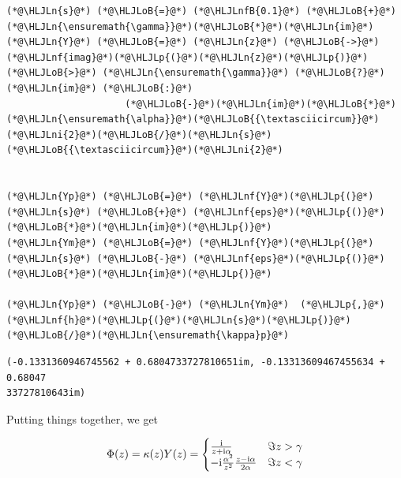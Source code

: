 \documentclass[12pt,a4paper]{article}
\newcommand{\HLJLn}[1]{#1}
\newcommand{\HLJLnf}[1]{\textcolor[RGB]{66,102,213}{#1}}
\newcommand{\HLJLnfB}[1]{\textcolor[RGB]{59,151,46}{#1}}
\newcommand{\HLJLni}[1]{\textcolor[RGB]{59,151,46}{#1}}
\newcommand{\HLJLoB}[1]{\textcolor[RGB]{102,102,102}{\textbf{#1}}}
\newcommand{\HLJLp}[1]{#1}
\def\I{ {\rm i} }
\begin{document}
\begin{lstlisting}
(*@\HLJLn{s}@*) (*@\HLJLoB{=}@*) (*@\HLJLnfB{0.1}@*) (*@\HLJLoB{+}@*) (*@\HLJLn{\ensuremath{\gamma}}@*)(*@\HLJLoB{*}@*)(*@\HLJLn{im}@*) 
(*@\HLJLn{Y}@*) (*@\HLJLoB{=}@*) (*@\HLJLn{z}@*) (*@\HLJLoB{->}@*) (*@\HLJLnf{imag}@*)(*@\HLJLp{(}@*)(*@\HLJLn{z}@*)(*@\HLJLp{)}@*) (*@\HLJLoB{>}@*) (*@\HLJLn{\ensuremath{\gamma}}@*) (*@\HLJLoB{?}@*) (*@\HLJLn{im}@*) (*@\HLJLoB{:}@*)
                     (*@\HLJLoB{-}@*)(*@\HLJLn{im}@*)(*@\HLJLoB{*}@*)(*@\HLJLn{\ensuremath{\alpha}}@*)(*@\HLJLoB{{\textasciicircum}}@*)(*@\HLJLni{2}@*)(*@\HLJLoB{/}@*)(*@\HLJLn{s}@*)(*@\HLJLoB{{\textasciicircum}}@*)(*@\HLJLni{2}@*)


(*@\HLJLn{Yp}@*) (*@\HLJLoB{=}@*) (*@\HLJLnf{Y}@*)(*@\HLJLp{(}@*)(*@\HLJLn{s}@*) (*@\HLJLoB{+}@*) (*@\HLJLnf{eps}@*)(*@\HLJLp{()}@*)(*@\HLJLoB{*}@*)(*@\HLJLn{im}@*)(*@\HLJLp{)}@*)
(*@\HLJLn{Ym}@*) (*@\HLJLoB{=}@*) (*@\HLJLnf{Y}@*)(*@\HLJLp{(}@*)(*@\HLJLn{s}@*) (*@\HLJLoB{-}@*) (*@\HLJLnf{eps}@*)(*@\HLJLp{()}@*)(*@\HLJLoB{*}@*)(*@\HLJLn{im}@*)(*@\HLJLp{)}@*)

(*@\HLJLn{Yp}@*) (*@\HLJLoB{-}@*) (*@\HLJLn{Ym}@*)  (*@\HLJLp{,}@*) (*@\HLJLnf{h}@*)(*@\HLJLp{(}@*)(*@\HLJLn{s}@*)(*@\HLJLp{)}@*)(*@\HLJLoB{/}@*)(*@\HLJLn{\ensuremath{\kappa}p}@*)
\end{lstlisting}

\begin{lstlisting}
(-0.1331360946745562 + 0.6804733727810651im, -0.13313609467455634 + 0.68047
33727810643im)
\end{lstlisting}


Putting things together, we get

\[
\Phi(z) = \kappa(z) Y(z) = \begin{cases} {\I \over z+\I \alpha }& \Im z > \gamma \\
                        -\I {\alpha^2 \over z^2} {z-\I \alpha \over 2 \alpha} & \Im z < \gamma
\end{cases}
\]
\end{document}
